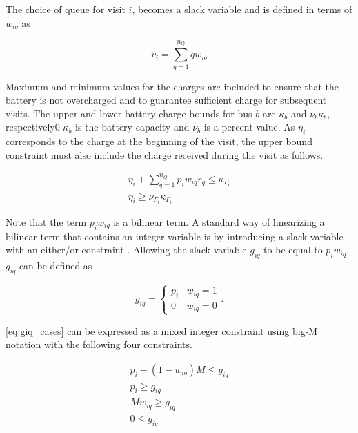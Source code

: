 The choice of queue for visit $i$, becomes a slack variable and is defined in terms of $w_{iq}$ as

\begin{equation}
    v_i = \sum_{q=1}^{n_Q} qw_{iq}
\end{equation}

Maximum and minimum values for the charges are included to ensure that the battery is not overcharged and to guarantee
sufficient charge for subsequent visits. The upper and lower battery charge bounds for bus $b$ are $\kappa_b$ and $\nu_b \kappa_b$,
respectively0 $\kappa_b$ is the battery capacity and $\nu_b$ is a percent value. As $\eta_i$ corresponds to the charge at the
beginning of the visit, the upper bound constraint must also include the charge received during the visit as follows.

\begin{subequations}
    \label{subeq:pre_min_max}
\begin{align}
    \eta_i + \sum_{q=1}^{n_Q} p_i w_{iq} r_q \leq \kappa_{\Gamma_i}                 \\
    \eta_i \geq \nu_{\Gamma_i} \kappa_{\Gamma_i}
\end{align}
\end{subequations}

Note that the term $p_i w_{iq}$ is a bilinear term. A standard way of linearizing a bilinear term that contains an
integer variable is by introducing a slack variable with an either/or constraint
\cite{chen-2010-applied,rodriguez-2013-compar-asses}. Allowing the slack variable $g_{iq}$ to be equal to $p_i w_{iq}$,
$g_{iq}$ can be defined as

\begin{equation}
    \label{eq:giq_cases}
    g_{iq} =
    \begin{cases}
        p_i & w_{iq} = 1 \\
        0 & w_{iq} = 0
    \end{cases}.
\end{equation}

\autoref{eq:giq_cases} can be expressed as a mixed integer constraint using big-M notation with the following four
constraints.

\begin{subequations}
    \label{eq:slack_gain}
\begin{align}
    p_i - (1 - w_{iq})M \leq g_{iq}  \label{subeq:repgpgret} \\
    p_i \geq g_{iq}                 \label{subeq:repgples} \\
    Mw_{iq} \geq g_{iq}              \label{subeq:repgwgret} \\
    0 \leq g_{iq}                   \label{subeq:repgwles}
\end{align}
\end{subequations}

